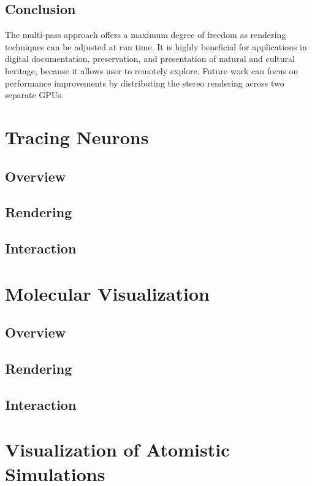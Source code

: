 \documentclass[10pt,twocolumn,letterpaper]{article}
\begin{document}
\subsection{Conclusion}
The multi-pass approach offers a maximum degree of freedom as rendering techniques can be adjusted at run time. It is highly beneficial for applications in digital documentation, preservation, and presentation of natural and cultural heritage, because it allows user to remotely explore. Future work can focus on performance improvements by distributing the stereo rendering across two separate GPUs.
\section{Tracing Neurons}
\subsection{Overview}
\subsection{Rendering}
\subsection{Interaction}

\section{Molecular Visualization}
\subsection{Overview}
\subsection{Rendering}
\subsection{Interaction}
\section{Visualization of Atomistic Simulations}
\end{document}
